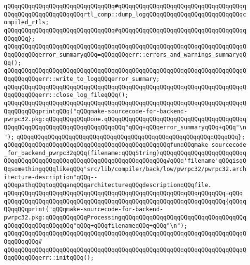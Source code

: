 \verb|qQQqqQQqqQQqqQQqqQQqqQQqqQQqqQQq#qQQqqQQqqQQqqQQqqQQqqQQqqQQqqQQqqQQqqQQqqQQqqQQqqQQqqQQqqQQqrtl_comp::dump_logqQQqqQQqqQQqqQQqqQQqqQQqqQQqcompiled_rtls;|\newline
\verb|qQQqqQQqqQQqqQQqqQQqqQQqqQQqqQQq#qQQqqQQqqQQqqQQqqQQqqQQqqQQqqQQqqQQqqQQqqQQq};|\newline
\newline
\verb|qQQqqQQqqQQqqQQqqQQqqQQqqQQqqQQqqQQqqQQqqQQqqQQqqQQqqQQqqQQqqQQqqQQqqQQqqQQqqQQqerror_summaryqQQq=qQQqqQQqerr::errors_and_warnings_summaryqQQq();|\newline
\verb|qQQqqQQqqQQqqQQqqQQqqQQqqQQqqQQqqQQqqQQqqQQqqQQqqQQqqQQqqQQqqQQqqQQqqQQqqQQqqQQqerr::write_to_logqQQqerror_summary;|\newline
\verb|qQQqqQQqqQQqqQQqqQQqqQQqqQQqqQQqqQQqqQQqqQQqqQQqqQQqqQQqqQQqqQQqqQQqqQQqqQQqqQQqerr::close_log_fileqQQq();|\newline
\newline
\verb|qQQqqQQqqQQqqQQqqQQqqQQqqQQqqQQqqQQqqQQqqQQqqQQqqQQqqQQqqQQqqQQqqQQqqQQqqQQqqQQqprintqQQq("qQQqmake-sourcecode-for-backend-pwrpc32.pkg:qQQqqQQqqQQqDone.qQQqqQQqqQQqqQQqqQQqqQQqqQQqqQQqqQQqqQQqqQQqqQQqqQQqqQQqqQQqqQQqqQQqqQQqqQQq"qQQq+qQQqerror_summaryqQQq+qQQq"\n");|\newline
\verb|qQQqqQQqqQQqqQQqqQQqqQQqqQQqqQQqqQQqqQQqqQQqqQQqqQQqqQQqqQQqqQQq};|\newline
\newline
\verb|qQQqqQQqqQQqqQQqqQQqqQQqqQQqqQQqqQQqqQQqqQQqqQQqfunqQQqmake_sourcecode_for_backend_pwrpc32qQQq(filename:qQQqString)qQQqqQQqqQQqqQQqqQQqqQQqqQQqqQQqqQQqqQQqqQQqqQQqqQQqqQQqqQQqqQQqqQQqqQQq#qQQq'filename'qQQqisqQQqsomethingqQQqlikeqQQq"src/lib/compiler/back/low/pwrpc32/pwrpc32.architecture-description"qQQq--qQQqpathqQQqtoqQQqanqQQqarchitectureqQQqdescriptionqQQqfile.|\newline
\verb|qQQqqQQqqQQqqQQqqQQqqQQqqQQqqQQqqQQqqQQqqQQqqQQqqQQqqQQqqQQqqQQq=qQQq|\newline
\verb|qQQqqQQqqQQqqQQqqQQqqQQqqQQqqQQqqQQqqQQqqQQqqQQqqQQqqQQqqQQqqQQq{qQQqqQQqqQQqprint("qQQqmake-sourcecode-for-backend-pwrpc32.pkg:qQQqqQQqqQQqProcessingqQQqqQQqqQQqqQQqqQQqqQQqqQQqqQQqqQQqqQQqqQQqqQQqqQQqqQQq"qQQq+qQQqfilenameqQQq+qQQq"\n");|\newline
\verb|qQQqqQQqqQQqqQQqqQQqqQQqqQQqqQQqqQQqqQQqqQQqqQQqqQQqqQQqqQQqqQQqqQQqqQQqqQQqqQQq#|\newline
\verb|qQQqqQQqqQQqqQQqqQQqqQQqqQQqqQQqqQQqqQQqqQQqqQQqqQQqqQQqqQQqqQQqqQQqqQQqqQQqqQQqerr::initqQQq();|\newline
